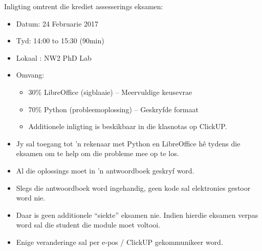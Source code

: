     \noindent
    Inligting omtrent die krediet assesserings eksamen:
    \begin{itemize}
        \item Datum: 24 Februarie 2017
        \item Tyd: 14:00 to 15:30 (90min)
        \item Lokaal : NW2 PhD Lab
        \item Omvang:
        \begin{itemize}
            \item 30\% LibreOffice (sigblaaie) -- Meervuldige keusevrae
            \item 70\% Python (probleemoplossing) -- Geskryfde formaat
            \item Additionele inligting is beskikbaar in die klasnotas op
                ClickUP.
        \end{itemize}
        \item Jy sal toegang tot 'n rekenaar met Python en LibreOffice h\^e
            tydens die eksamen om te help om die probleme mee op te los.
        \item Al die oplossings moet in 'n antwoordboek geskryf word.
        \item Slegs die antwoordboek word ingehandig, geen kode sal elektronies
            gestoor word nie.
        \item Daar is geen additionele ``siekte'' eksamen nie. Indien hierdie
            eksamen verpas word sal die student die module moet voltooi.
        \item Enige veranderinge sal per e-pos / ClickUP gekommunikeer word.
    \end{itemize}

